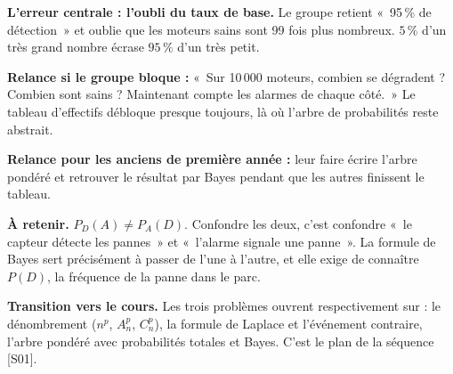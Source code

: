 \documentclass[a4paper,11pt]{article}
\begin{document}
\begin{piege}
\textbf{L'erreur centrale : l'oubli du taux de base.} Le groupe retient «~95\,\% de détection~» et oublie que les moteurs sains sont 99 fois plus nombreux. $5\,\%$ d'un très grand nombre écrase $95\,\%$ d'un très petit.

\textbf{Relance si le groupe bloque :} «~Sur 10\,000 moteurs, combien se dégradent ? Combien sont sains ? Maintenant compte les alarmes de chaque côté.~» Le tableau d'effectifs débloque presque toujours, là où l'arbre de probabilités reste abstrait.

\textbf{Relance pour les anciens de première année :} leur faire écrire l'arbre pondéré et retrouver le résultat par Bayes pendant que les autres finissent le tableau.
\end{piege}

\begin{cle}
\textbf{À retenir.} $P_D(A) \neq P_A(D)$. Confondre les deux, c'est confondre «~le capteur détecte les pannes~» et «~l'alarme signale une panne~». La formule de Bayes sert précisément à passer de l'une à l'autre, et elle exige de connaître $P(D)$, la fréquence de la panne dans le parc.
\end{cle}

\vspace{6pt}
\begin{consigne}
\textbf{Transition vers le cours.} Les trois problèmes ouvrent respectivement sur : le dénombrement ($n^p$, $A_n^p$, $C_n^p$), la formule de Laplace et l'événement contraire, l'arbre pondéré avec probabilités totales et Bayes. C'est le plan de la séquence [S01].
\end{consigne}
\end{document}

